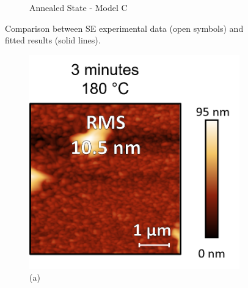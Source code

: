 \begin{figure}[htbp]
\begin{subfigure}[t]{0.45\textwidth}
        \caption{Annealed State - Model C}
        \label{fig:ellipsometry:static_fits:t23_fixed_thick_50_void}
    \end{subfigure}
    \caption{Comparison between SE experimental data (open symbols) and fitted results (solid lines).}
    \label{fig:ellipsometry:static_fits}
\end{figure}


\begin{figure}[htbp]
    \centering
    \begin{subfigure}[t]{0.4\textwidth}
        \centering
        \includegraphics[width=\textwidth]{chapters/ellipsometry/image/180C_3min.png} %
        \caption*{(a)}
    \end{subfigure}
    \hfill
    \begin{subfigure}[t]{0.4\textwidth}
        \centering

\end{subfigure}
\end{figure}

